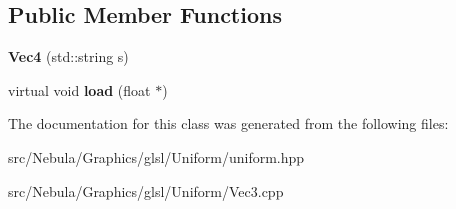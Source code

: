 \subsection*{\-Public \-Member \-Functions}
\begin{DoxyCompactItemize}
\item 
\hypertarget{classNeb_1_1glsl_1_1Uniform_1_1Scalar_1_1Vec4_a1e9c061fa7bf37160ecaa5cbb147ddcb}{{\bfseries \-Vec4} (std\-::string s)}\label{classNeb_1_1glsl_1_1Uniform_1_1Scalar_1_1Vec4_a1e9c061fa7bf37160ecaa5cbb147ddcb}

\item 
\hypertarget{classNeb_1_1glsl_1_1Uniform_1_1Scalar_1_1Vec4_a4c000d4d4cffd1df892ed2f528c6931e}{virtual void {\bfseries load} (float $\ast$)}\label{classNeb_1_1glsl_1_1Uniform_1_1Scalar_1_1Vec4_a4c000d4d4cffd1df892ed2f528c6931e}

\end{DoxyCompactItemize}


\-The documentation for this class was generated from the following files\-:\begin{DoxyCompactItemize}
\item 
src/\-Nebula/\-Graphics/glsl/\-Uniform/uniform.\-hpp\item 
src/\-Nebula/\-Graphics/glsl/\-Uniform/\-Vec3.\-cpp\end{DoxyCompactItemize}
